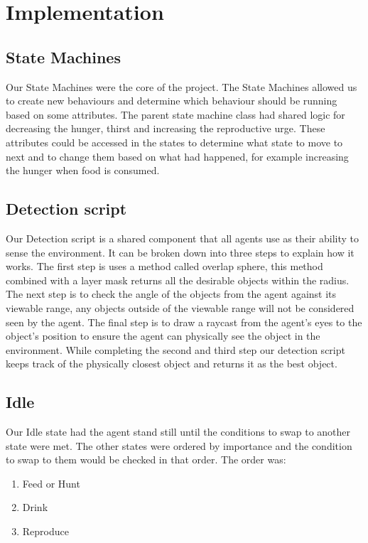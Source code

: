 \documentclass[a4paper, oneside, 11pt]{report}
\begin{document}
\chapter{Implementation}\label{Impl}

\section{State Machines}

	Our State Machines were the core of the project. The State Machines allowed us to create new behaviours and determine which behaviour should be running based on some attributes. The parent state machine class had shared logic for decreasing the hunger, thirst and increasing the reproductive urge. These attributes could be accessed in the states to determine what state to move to next and to change them based on what had happened, for example increasing the hunger when food is consumed.

\section{Detection script}
	Our Detection script is a shared component that all agents use as their ability to sense the environment. It can be broken down into three steps to explain how it works. The first step is uses a method called overlap sphere, this method combined with a layer mask returns all the desirable objects within the radius. The next step is to check the angle of the objects from the agent against its viewable range, any objects outside of the viewable range will not be considered seen by the agent. The final step is to draw a raycast from the agent's eyes to the object's position to ensure the agent can physically see the object in the environment. While completing the second and third step our detection script keeps track of the physically closest object and returns it as the best object.

\section{Idle}
	Our Idle state had the agent stand still until the conditions to swap to another state were met. The other states were ordered by importance and the condition to swap to them would be checked in that order. The order was:
	\begin{enumerate}
		\item{Feed or Hunt}
		\item{Drink}
		\item{Reproduce}
	\end{enumerate}
\end{document}
